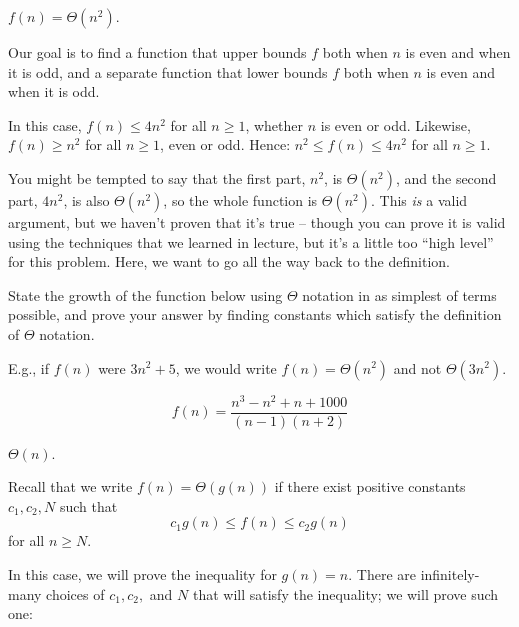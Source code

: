 \begin{prob}
\begin{subprobset}
\begin{subprob}
            \begin{soln}
                $f(n) = \Theta(n^2)$.
                
                Our goal is to find a function that upper bounds $f$ both when $n$ is even and when it is odd, and a separate
                function that lower bounds $f$ both when $n$ is even and when it is odd.

                In this case, $f(n) \leq 4n^2$ for all $n \geq 1$, whether $n$ is even or odd.
                Likewise, $f(n) \geq n^2$ for all $n \geq 1$, even or odd. Hence:
                $n^2 \leq f(n) \leq 4n^2$ for all $n \geq 1$.
                
                You might be tempted to say that the first part, $n^2$, is $\Theta(n^2)$, and 
                the second part, $4n^2$, is also $\Theta(n^2)$, so the whole function is $\Theta(n^2)$.
                This \emph{is} a valid argument, but we haven't proven that it's true -- though you can
                prove it is valid using the techniques that
                we learned in lecture, but it's a little too ``high level'' for this problem. Here, we
                want to go all the way back to the definition.
            \end{soln}
        \end{subprob}

        \begin{subprob}
            State the growth of the function below using $\Theta$ notation in as
            simplest of terms possible, and prove your answer by finding constants
            which satisfy the definition of $\Theta$ notation.

            E.g., if $f(n)$ were $3n^2 + 5$, we would write $f(n) = \Theta(n^2)$ and not $\Theta(3n^2)$.

            \[
                f(n) = \frac{n^3 - n^2 + n + 1000}{(n-1)(n+2)}
            \]
            
            \begin{soln}
                $\Theta(n)$.

                Recall that we write $f(n) = \Theta(g(n))$ if there exist positive constants $c_1, c_2, N$
                such that
                \[
                    c_1 g(n) \leq f(n) \leq c_2 g(n)
                \]
                for all $n \geq N$.

                In this case, we will prove the inequality for $g(n) = n$. There are infinitely-many choices
                of $c_1, c_2, $ and $N$ that will satisfy the inequality; we will prove such one:


\end{soln}
\end{subprob}
\end{subprobset}
\end{prob}
